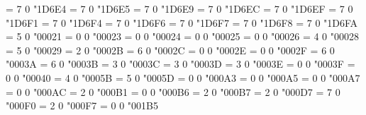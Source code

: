\Umathchardef\varGamma   = 7 0 "1D6E4
\Umathchardef\varDelta   = 7 0 "1D6E5
\Umathchardef\varTheta   = 7 0 "1D6E9
\Umathchardef\varLambda  = 7 0 "1D6EC
\Umathchardef\varXi      = 7 0 "1D6EF
\Umathchardef\varPi      = 7 0 "1D6F1
\Umathchardef\varSigma   = 7 0 "1D6F4
\Umathchardef\varUpsilon = 7 0 "1D6F6
\Umathchardef\varPhi     = 7 0 "1D6F7
\Umathchardef\varPsi     = 7 0 "1D6F8
\Umathchardef\varOmega   = 7 0 "1D6FA
\let\mitGamma\varGamma
\let\mitDelta\varDelta
\let\mitTheta\varTheta
\let\mitLambda\varLambda
\let\mitXi\varXi
\let\mitPi\varPi
\let\mitSigma\varSigma
\let\mitUpsilon\varUpsilon
\let\mitPhi\varPhi
\let\mitPsi\varPsi
\let\mitOmega\varOmega
\Umathchardef\mathexclam = 5 0 "00021 %
\Umathchardef\mathoctothorpe = 0 0 "00023 %
\Umathchardef\mathdollar = 0 0 "00024 %
\Umathchardef\mathpercent = 0 0 "00025 %
\Umathchardef\mathampersand = 0 0 "00026 %
\Umathchardef\lparen = 4 0 "00028 %
\Umathchardef\rparen = 5 0 "00029 %
\Umathchardef\mathplus = 2 0 "0002B %
\Umathchardef\mathcomma = 6 0 "0002C %
\Umathchardef\mathperiod = 0 0 "0002E %
\Umathchardef\mathslash = 0 0 "0002F %
\Umathchardef\mathcolon = 6 0 "0003A %
\Umathchardef\mathsemicolon = 6 0 "0003B %
\Umathchardef\less = 3 0 "0003C %
\Umathchardef\equal = 3 0 "0003D %
\Umathchardef\greater = 3 0 "0003E %
\Umathchardef\mathquestion = 0 0 "0003F %
\Umathchardef\mathatsign = 0 0 "00040 %
\Umathchardef\lbrack = 4 0 "0005B %
\def\backslash{\Udelimiter 0 0 "0005C }
\Umathchardef\rbrack = 5 0 "0005D %
\def\lbrace{\Udelimiter 4 0 "0007B }
\def\vert{\Udelimiter 0 0 "0007C }
\def\rbrace{\Udelimiter 5 0 "0007D }
\Umathchardef\mathsterling = 0 0 "000A3 %
\Umathchardef\mathyen = 0 0 "000A5 %
\Umathchardef\mathsection = 0 0 "000A7 %
\Umathchardef\neg = 0 0 "000AC %
\Umathchardef\pm = 2 0 "000B1 %
\Umathchardef\mathparagraph = 0 0 "000B6 %
\Umathchardef\cdotp = 2 0 "000B7 %
\Umathchardef\times = 2 0 "000D7 %
\Umathchardef\matheth = 7 0 "000F0 %
\Umathchardef\div = 2 0 "000F7 %
\Umathchardef\Zbar = 0 0 "001B5 %
\def\grave{\Umathaccent 7 0 "00300 } %
\def\acute{\Umathaccent 7 0 "00301 } %
